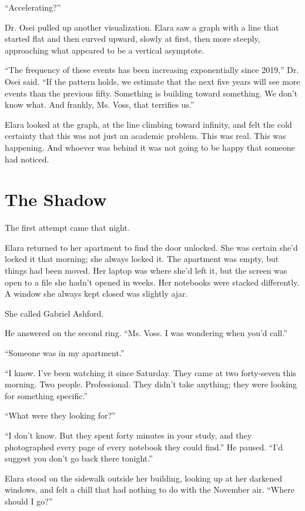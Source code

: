 \documentclass[
    language=english,
    doctype=novel,
    institution=none,
]{../../omnilatex}
\begin{document}
``Accelerating?''

Dr. Osei pulled up another visualization. Elara saw a graph with a line that started flat and then curved upward, slowly at first, then more steeply, approaching what appeared to be a vertical asymptote.

``The frequency of these events has been increasing exponentially since 2019,'' Dr. Osei said. ``If the pattern holds, we estimate that the next five years will see more events than the previous fifty. Something is building toward something. We don't know what. And frankly, Ms. Voss, that terrifies us.''

Elara looked at the graph, at the line climbing toward infinity, and felt the cold certainty that this was not just an academic problem. This was real. This was happening. And whoever was behind it was not going to be happy that someone had noticed.

\chapter{The Shadow}

The first attempt came that night.

Elara returned to her apartment to find the door unlocked. She was certain she'd locked it that morning; she always locked it. The apartment was empty, but things had been moved. Her laptop was where she'd left it, but the screen was open to a file she hadn't opened in weeks. Her notebooks were stacked differently. A window she always kept closed was slightly ajar.

She called Gabriel Ashford.

He answered on the second ring. ``Ms. Voss. I was wondering when you'd call.''

``Someone was in my apartment.''

``I know. I've been watching it since Saturday. They came at two forty-seven this morning. Two people. Professional. They didn't take anything; they were looking for something specific.''

``What were they looking for?''

``I don't know. But they spent forty minutes in your study, and they photographed every page of every notebook they could find.'' He paused. ``I'd suggest you don't go back there tonight.''

Elara stood on the sidewalk outside her building, looking up at her darkened windows, and felt a chill that had nothing to do with the November air. ``Where should I go?''
\end{document}
